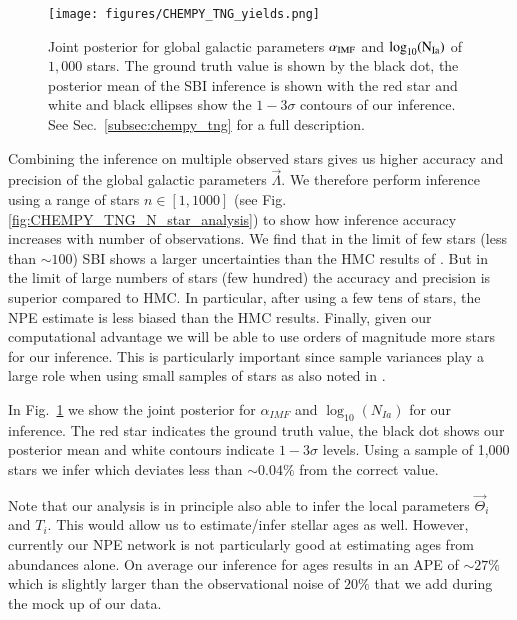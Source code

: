 \documentclass{aa}
\begin{document}
\begin{figure}
    \centering
    \texttt{[image: figures/CHEMPY\_TNG\_yields.png]}
    \vspace{-.25cm}
    \caption{Joint posterior for global galactic parameters $\alpha_{\rm IMF}$ and $\log_{10}(\rm N_{Ia})$ of $1,000$ stars. The ground truth value is shown by the black dot, the posterior mean of the SBI inference is shown with the red star and white and black ellipses show the $1-3\sigma$ contours of our inference. See Sec.~\ref{subsec:chempy_tng} for a full description.}
    \label{fig:CHEMPY_TNG_sbi} 
\end{figure}

%
Combining the inference on multiple observed stars gives us higher accuracy and precision of the global galactic parameters $\vec\Lambda$. We therefore perform inference using a range of stars $n\in[1,1000]$ (see Fig. \ref{fig:CHEMPY_TNG_N_star_analysis}) to show how inference accuracy increases with number of observations. We find that in the limit of few stars (less than $\sim100$) SBI shows a larger uncertainties than the HMC results of \citet{Philcox_2019}. But in the limit of large numbers of stars (few hundred) the accuracy and precision is superior compared to HMC. In particular, after using a few tens of stars, the NPE estimate is less biased than the HMC results. 
Finally, given our computational advantage we will be able to use orders of magnitude more stars for our inference.
This is particularly important since sample variances play a large role when using small samples of stars as also noted in \citet{Philcox_2019}.
%

In Fig.~\ref{fig:CHEMPY_TNG_sbi} we show the joint posterior for $\alpha_{IMF}$ and $\log_{10}(N_{Ia})$ for our inference. The red star indicates the ground truth value, the black dot shows our posterior mean and white contours indicate $1-3\sigma$ levels.
%
Using a sample of 1,000 stars we infer  which deviates less than $\sim0.04\%$ from the correct value.

Note that our analysis is in principle also able to infer the local parameters $\Vec{\Theta}_i$ and $T_i$. This would allow us to estimate/infer stellar ages as well. However, currently our NPE network is not particularly good at estimating ages from abundances alone. On average our inference for ages results in an APE of $\sim27\%$ which is slightly larger than the observational noise of $20\%$ that we add during the mock up of our data.
\end{document}
